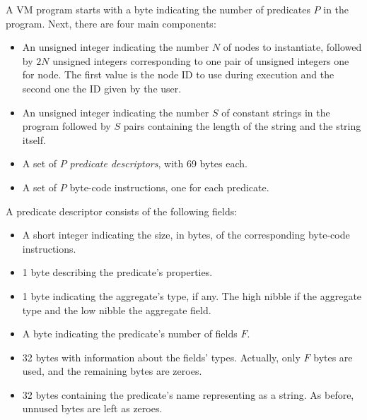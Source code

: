 \documentclass{article}
\begin{document}
\newcommand{\inst}[3]{#1&\byte#2\\\endbyte&{\it #3}\\}
\newcommand{\op}[2]{\ensuremath{#1}&\byte#2\\\endbyte\\}
\newcommand{\val}[3]{#1&\byte#2\\\endbyte&{\it #3}\\}


A VM program starts with a byte indicating the number of predicates $P$ in the
program. Next, there are four main components:

\begin{itemize}
	\item An unsigned integer indicating the number $N$ of nodes to instantiate, followed by $2N$ unsigned integers corresponding to one pair of unsigned integers one for node. The first value is the node ID to use during execution and the second one the ID given by the user.
	\item An unsigned integer indicating the number $S$ of constant strings in the program followed by $S$ pairs containing the length of the string and the string itself.
	\item A set of $P$ \emph{predicate descriptors}, with 69 bytes each.
	\item A set of $P$ byte-code instructions, one for each predicate.
\end{itemize}

A predicate descriptor consists of the following fields:
\begin{itemize}
	\item A short integer indicating the size, in bytes, of the corresponding byte-code instructions.
	\item 1 byte describing the predicate's properties.
	\item 1 byte indicating the aggregate's type, if any. The high nibble if the aggregate type and the low nibble the aggregate field.
	\item A byte indicating the predicate's number of fields $F$.
	\item 32 bytes with information about the fields' types. Actually, only $F$ bytes are used, and the remaining bytes are zeroes.
	\item 32 bytes containing the predicate's name representing as a string. As before, unnused bytes are left as zeroes.
\end{itemize}
\end{document}
